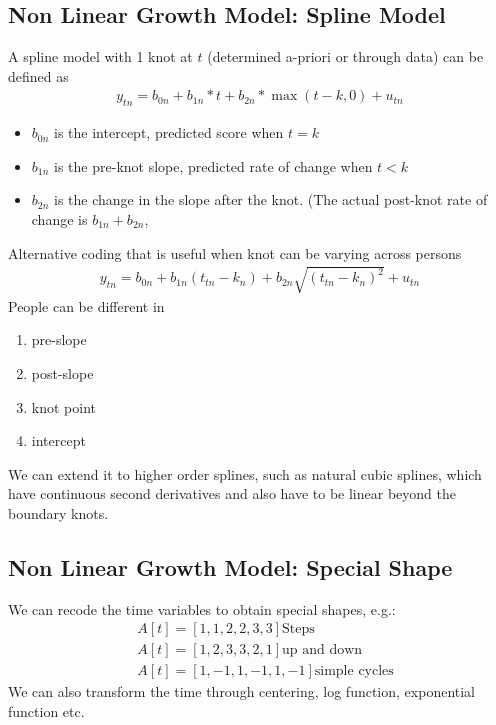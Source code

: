 \subsection{Non Linear Growth Model: Spline Model} 
A spline model with 1 knot at $t$ (determined a-priori or through data) can be defined as 
    \begin{align*}
        y_{tn} = b_{0n} + b_{1n}*t + b_{2n} * \max(t-k,0) + u_{tn}
    \end{align*}
    \begin{itemize}
        \item $b_{0n}$ is the intercept, predicted score when $t=k$
        \item $b_{1n}$ is the pre-knot slope, predicted rate of change when $t<k$
        \item $b_{2n}$ is the change in the slope after the knot. (The actual post-knot rate of change is $b_{1n} + b_{2n}$, 
    \end{itemize}
Alternative coding that is useful when knot can be varying across persons
    \begin{align*}
        y_{tn} = b_{0n} + b_{1n}(t_{tn} - k_n) + b_{2n}\sqrt{(t_{tn} - k_n)^2} + u_{tn}
    \end{align*}
People can be different in 
    \begin{enumerate}
        \item pre-slope 
        \item post-slope
        \item knot point 
        \item intercept
    \end{enumerate}
We can extend it to higher order splines, such as natural cubic splines, which have continuous second derivatives and also have to be linear beyond the boundary knots.  

\subsection{Non Linear Growth Model: Special Shape} 
We can recode the time variables to obtain special shapes, e.g.: 
    \begin{align*}
        & A[t] = [1,1,2,2,3,3] \text{Steps} \\
        & A[t] = [1,2,3,3,2,1] \text{up and down} \\
        & A[t] = [1,-1,1,-1,1,-1] \text{simple cycles} 
    \end{align*}
We can also transform the time through centering, log function, exponential function etc. 

